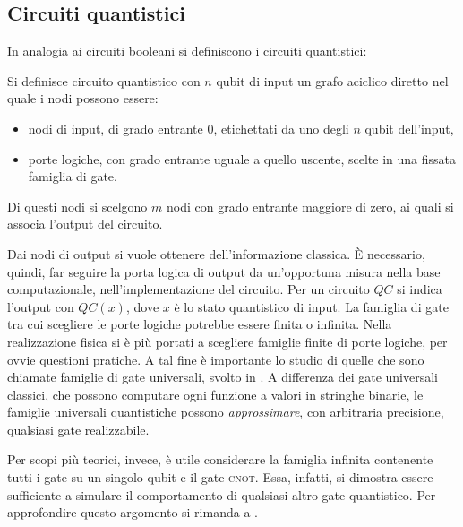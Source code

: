 \subsection{Circuiti quantistici}\label{sec:QCircuits}
In analogia ai circuiti booleani si definiscono i circuiti quantistici:
\begin{defn}
 Si definisce {\upshape circuito quantistico} con $n$ qubit di input un grafo aciclico diretto nel quale i nodi possono essere:
 \begin{itemize}
  \item {\upshape nodi di input}, di grado entrante $0$, etichettati da uno degli $n$ qubit dell'input,
  \item {\upshape porte logiche}, con grado entrante uguale a quello uscente, scelte in una fissata famiglia di gate.
 \end{itemize}
 Di questi nodi si scelgono $m$ nodi con grado entrante maggiore di zero, ai quali si associa l'{\upshape output} del circuito.
\end{defn}
Dai nodi di output si vuole ottenere dell'informazione classica.
È necessario, quindi, far seguire la porta logica di output da un'opportuna misura nella base computazionale, nell'implementazione del circuito.
Per un circuito $QC$ si indica l'output con $QC(x)$, dove $x$ è lo stato quantistico di input.
La famiglia di gate tra cui scegliere le porte logiche potrebbe essere finita o infinita.
Nella realizzazione fisica si è più portati a scegliere famiglie finite di porte logiche, per ovvie questioni pratiche.
A tal fine è importante lo studio di quelle che sono chiamate famiglie di gate universali, svolto in \cite{Book:QCQI}.
A differenza dei gate universali classici, che possono computare ogni funzione a valori in stringhe binarie, le famiglie universali quantistiche possono \textit{approssimare}, con arbitraria precisione, qualsiasi gate realizzabile.

Per scopi più teorici, invece, è utile considerare la famiglia infinita contenente tutti i gate su un singolo qubit e il gate \textsc{cnot}.
Essa, infatti, si dimostra essere sufficiente a simulare il comportamento di qualsiasi altro gate quantistico.
Per approfondire questo argomento si rimanda a \cite{Book:QCQI}.

